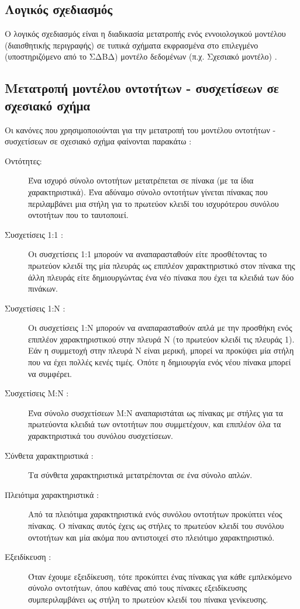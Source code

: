\documentclass{assignment}
\begin{document}
\subsection{Λογικός σχεδιασμός}

Ο λογικός σχεδιασμός είναι η διαδικασία μετατροπής ενός εννοιολογικού μοντέλου (διαισθητικής περιγραφής) σε τυπικά σχήματα εκφρασμένα στο επιλεγμένο (υποστηριζόμενο από το ΣΔΒΔ) μοντέλο δεδομένων (π.χ. Σχεσιακό μοντέλο) \cite{theodoridis_class_notes}.



\subsection{Μετατροπή μοντέλου οντοτήτων - συσχετίσεων σε σχεσιακό σχή\-μα}

Οι κανόνες που χρησιμοποιούνται για την μετατροπή του μοντέλου οντοτήτων - συσχετίσεων σε σχεσιακό σχήμα φαίνονται παρακάτω \cite{theodoridis_class_notes}:

\begin{description}

  \item[Οντότητες:] Ένα ισχυρό σύνολο οντοτήτων μετατρέπεται σε πίνακα (με τα ίδια χαρακτηριστικά). Ένα αδύναμο σύνολο οντοτήτων γίνεται πίνακας που περιλαμβάνει μια στήλη για το πρωτεύον κλειδί του ισχυρότερου συνόλου οντοτήτων που το ταυτοποιεί. 
  \item[Συσχετίσεις 1:1 :] Οι συσχετίσεις 1:1 μπορούν να αναπαρασταθούν είτε προσθέτοντας το πρωτεύον κλειδί της μία πλευράς ως επιπλέον χαρακτηριστικό στον πίνακα της άλλη πλευράς είτε δημιουργώντας ένα νέο πίνακα που έχει τα κλειδιά των δύο πινάκων.
  \item[Συσχετίσεις 1:Ν :] Οι συσχετίσεις 1:Ν μπορούν να αναπαρασταθούν απλά με την προσθήκη ενός επιπλέον χαρακτηριστικού στην πλευρά Ν (το πρωτεύον κλειδί τις πλευράς 1). Εάν η συμμετοχή στην πλευρά Ν είναι μερική, μπορεί να προκύψει μία στήλη που να έχει πολλές κενές τιμές. Οπότε η δημιουργία ενός νέου πίνακα μπορεί να συμφέρει.
  \item[Συσχετίσεις Μ:Ν :] Ένα σύνολο συσχετίσεων M:N αναπαριστάται ως πίνακας με στήλες για τα πρωτεύοντα κλειδιά των οντοτήτων που συμμετέχουν, και επιπλέον όλα τα χαρακτηριστικά του συνόλου συσχετίσεων. 
  \item[Σύνθετα χαρακτηριστικά :] Τα σύνθετα χαρακτηριστικά μετατρέπονται σε ένα σύνολο απλών.
  \item[Πλειότιμα χαρακτηριστικά :] Από τα πλειότιμα χαρακτηριστικά ενός συνόλου οντοτήτων προκύπτει νέος πίνακας. Ο πίνακας αυτός έχεις ως στήλες το πρωτεύον κλειδί του συνόλου οντοτήτων και μία ακόμα που αντιστοιχεί στο πλειότιμο χαρακτηριστικό.
  \item[Εξειδίκευση :] Όταν έχουμε εξειδίκευση, τότε προκύπτει ένας πίνακας για κάθε εμπλεκόμενο σύνολο οντοτήτων, όπου καθένας από τους πίνακες εξειδίκευσης συμπεριλαμβάνει ως στήλη το πρωτεύον κλειδί του πίνακα γενίκευσης.
 
\end{description}
\end{document}
